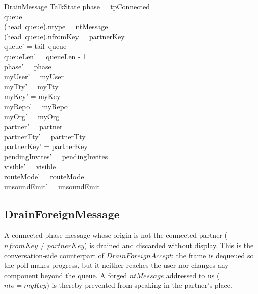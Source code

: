 \documentclass[a4paper,10pt,fleqn]{article}
\begin{document}
\begin{schema}{DrainMessage}
  \Delta TalkState
\where
  phase = tpConnected \\
  queue \neq \langle \rangle \\
  (head~queue).ntype = ntMessage \\
  (head~queue).nfromKey = partnerKey \\
  queue' = tail~queue \\
  queueLen' = queueLen - 1 \\
  phase' = phase \\
  myUser' = myUser \\
  myTty' = myTty \\
  myKey' = myKey \\
  myRepo' = myRepo \\
  myOrg' = myOrg \\
  partner' = partner \\
  partnerTty' = partnerTty \\
  partnerKey' = partnerKey \\
  pendingInvites' = pendingInvites \\
  visible' = visible \\
  routeMode' = routeMode \\
  unsoundEmit' = unsoundEmit
\end{schema}

\subsection{DrainForeignMessage}

A connected-phase message whose origin is not the connected partner
($nfromKey \neq partnerKey$) is drained and discarded without display.
This is the conversation-side counterpart of $DrainForeignAccept$: the
frame is dequeued so the poll makes progress, but it neither reaches
the user nor changes any component beyond the queue.  A forged
$ntMessage$ addressed to us ($nto = myKey$) is thereby prevented from
speaking in the partner's place.
\end{document}
